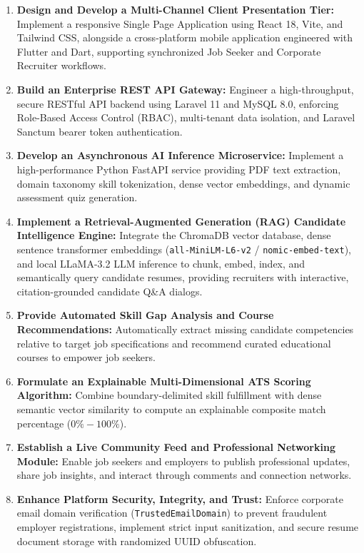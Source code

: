\begin{enumerate}
    \item \textbf{Design and Develop a Multi-Channel Client Presentation Tier:} Implement a responsive Single Page Application using React 18, Vite, and Tailwind CSS, alongside a cross-platform mobile application engineered with Flutter and Dart, supporting synchronized Job Seeker and Corporate Recruiter workflows.
    \item \textbf{Build an Enterprise REST API Gateway:} Engineer a high-throughput, secure RESTful API backend using Laravel 11 and MySQL 8.0, enforcing Role-Based Access Control (RBAC), multi-tenant data isolation, and Laravel Sanctum bearer token authentication.
    \item \textbf{Develop an Asynchronous AI Inference Microservice:} Implement a high-performance Python FastAPI service providing PDF text extraction, domain taxonomy skill tokenization, dense vector embeddings, and dynamic assessment quiz generation.
    \item \textbf{Implement a Retrieval-Augmented Generation (RAG) Candidate Intelligence Engine:} Integrate the ChromaDB vector database, dense sentence transformer embeddings (\texttt{all-MiniLM-L6-v2} / \texttt{nomic-embed-text}), and local LLaMA-3.2 LLM inference to chunk, embed, index, and semantically query candidate resumes, providing recruiters with interactive, citation-grounded candidate Q\&A dialogs.
    \item \textbf{Provide Automated Skill Gap Analysis and Course Recommendations:} Automatically extract missing candidate competencies relative to target job specifications and recommend curated educational courses to empower job seekers.
    \item \textbf{Formulate an Explainable Multi-Dimensional ATS Scoring Algorithm:} Combine boundary-delimited skill fulfillment with dense semantic vector similarity to compute an explainable composite match percentage ($0\% - 100\%$).
    \item \textbf{Establish a Live Community Feed and Professional Networking Module:} Enable job seekers and employers to publish professional updates, share job insights, and interact through comments and connection networks.
    \item \textbf{Enhance Platform Security, Integrity, and Trust:} Enforce corporate email domain verification (\texttt{TrustedEmailDomain}) to prevent fraudulent employer registrations, implement strict input sanitization, and secure resume document storage with randomized UUID obfuscation.
\end{enumerate}

